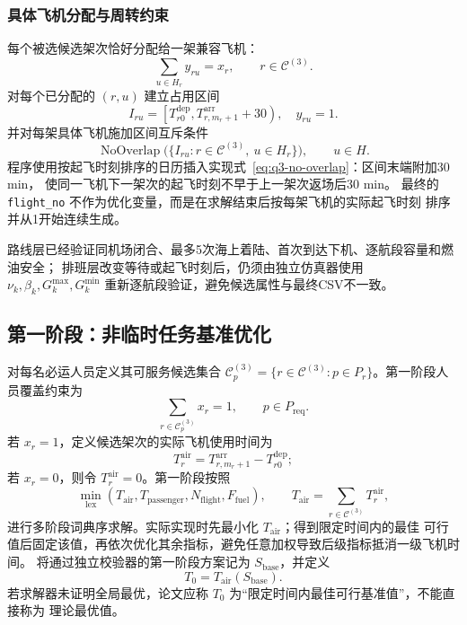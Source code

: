 \documentclass[UTF8,a4paper,zihao=5]{ctexart}
\begin{document}
\subsubsection{具体飞机分配与周转约束}

每个被选候选架次恰好分配给一架兼容飞机：
\begin{equation}
  \sum_{u\in H_r}y_{ru}=x_r,
  \qquad r\in\mathcal{C}^{(3)}.
  \label{eq:q3-aircraft-assignment}
\end{equation}
对每个已分配的 $(r,u)$ 建立占用区间
\begin{equation}
  I_{ru}=\left[
    T_{r0}^{\mathrm{dep}},
    T_{r,m_r+1}^{\mathrm{arr}}+30
  \right),
  \quad y_{ru}=1.
  \label{eq:q3-optional-interval}
\end{equation}
并对每架具体飞机施加区间互斥条件
\begin{equation}
  \operatorname{NoOverlap}\bigl(\{I_{ru}:r\in\mathcal{C}^{(3)},\ u\in H_r\}\bigr),
  \qquad u\in H.
  \label{eq:q3-no-overlap}
\end{equation}
程序使用按起飞时刻排序的日历插入实现式~\eqref{eq:q3-no-overlap}：区间末端附加30 min，
使同一飞机下一架次的起飞时刻不早于上一架次返场后30 min。
最终的 \texttt{flight\_no} 不作为优化变量，而是在求解结束后按每架飞机的实际起飞时刻
排序并从1开始连续生成。

路线层已经验证同机场闭合、最多5次海上着陆、首次到达下机、逐航段容量和燃油安全；
排班层改变等待或起飞时刻后，仍须由独立仿真器使用
$\nu_k,\beta_k,G_k^{\max},G_k^{\min}$ 重新逐航段验证，避免候选属性与最终CSV不一致。

\subsection{第一阶段：非临时任务基准优化}

对每名必运人员定义其可服务候选集合
$\mathcal{C}^{(3)}_p=\{r\in\mathcal{C}^{(3)}:p\in P_r\}$。第一阶段人员覆盖约束为
\begin{equation}
  \sum_{r\in\mathcal{C}^{(3)}_p}x_r=1,
  \qquad p\in P_{\mathrm{req}}.
  \label{eq:q3-mandatory-cover}
\end{equation}
若 $x_r=1$，定义候选架次的实际飞机使用时间为
\begin{equation}
  T_r^{\mathrm{air}}
  =T_{r,m_r+1}^{\mathrm{arr}}-T_{r0}^{\mathrm{dep}};
  \label{eq:q3-flight-duration}
\end{equation}
若 $x_r=0$，则令 $T_r^{\mathrm{air}}=0$。第一阶段按照
\begin{equation}
  \min_{\mathrm{lex}}
  \left(
    T_{\mathrm{air}},
    T_{\mathrm{passenger}},
    N_{\mathrm{flight}},
    F_{\mathrm{fuel}}
  \right),
  \qquad
  T_{\mathrm{air}}=\sum_{r\in\mathcal{C}^{(3)}}T_r^{\mathrm{air}},
  \label{eq:q3-stage1-objective}
\end{equation}
进行多阶段词典序求解。实际实现时先最小化 $T_{\mathrm{air}}$；得到限定时间内的最佳
可行值后固定该值，再依次优化其余指标，避免任意加权导致后级指标抵消一级飞机时间。
将通过独立校验器的第一阶段方案记为 $S_{\mathrm{base}}$，并定义
\begin{equation}
  T_0=T_{\mathrm{air}}(S_{\mathrm{base}}).
  \label{eq:q3-baseline-time}
\end{equation}
若求解器未证明全局最优，论文应称 $T_0$ 为“限定时间内最佳可行基准值”，不能直接称为
理论最优值。
\end{document}
